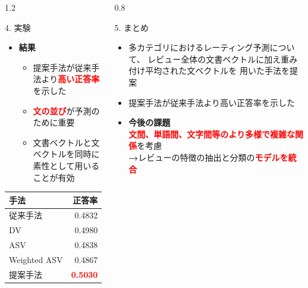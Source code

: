 \documentclass[unicode,10pt]{beamer}
\newlength{\mycolumnwidth}
\newcommand{\arrow}{\textcolor{ttiblue}{\textbf{→}}\hspace{1ex}}
\newcommand{\itemtitle}[1]{\textbf{#1}\\}
\newcommand{\fire}[1]{\textcolor{red}{\textbf{#1}}}
\newcommand{\doublecolumns}[4]{
    \begin{minipage}[t]{#1}
      #2
    \end{minipage}
    \begin{minipage}[t]{#3}
      #4
    \end{minipage}}
\begin{document}
\begin{frame}
\begin{columns}[onlytextwidth,t]
\begin{column}{1.2\mycolumnwidth}
\begin{block}{4. 実験}
      \doublecolumns{0.6\textwidth}{
        \begin{itemize}
          \item \itemtitle{結果}
            \begin{itemize}
              \item 提案手法が従来手法より\fire{高い正答率}を示した
              \item \fire{文の並び}が予測のために重要
              \item 文書ベクトルと文ベクトルを同時に素性として用いることが有効
            \end{itemize}
        \end{itemize}
      }{0.375\textwidth}{
        \begin{table}
          \centering
          \begin{tabular}{l | r}
            手法 & 正答率 \\
            \hline
            従来手法\cite{fujitani15} & 0.4832 \\
            DV & 0.4980 \\
            ASV & 0.4838 \\
            Weighted ASV & 0.4867 \\
            提案手法 & \fire{0.5030} \\
          \end{tabular}
        \end{table}
      }
    \end{block}
  \end{column}

  \begin{column}{0.8\mycolumnwidth}
    \begin{block}{5. まとめ}
      \begin{itemize}
        \item 多カテゴリにおけるレーティング予測について、
              レビュー全体の文書ベクトルに加え重み付け平均された文ベクトルを
              用いた手法を提案
        \item 提案手法が従来手法\cite{fujitani15}より高い正答率を示した
        \item \itemtitle{今後の課題}
              \fire{文間、単語間、文字間等のより多様で複雑な関係}を考慮 \\
              \arrow レビューの特徴の抽出と分類の\fire{モデルを統合}
      \end{itemize}
    \end{block}


\end{column}
\end{columns}
\end{frame}
\end{document}
